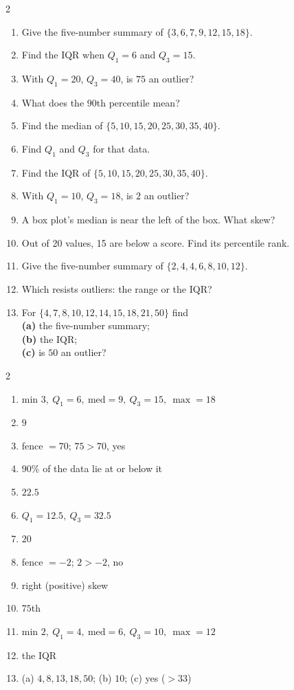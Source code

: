 \documentclass[11pt]{article}
\begin{document}
\clearpage
{}

\begin{recapbox}
\begin{multicols}{2}
\small
\begin{enumerate}[leftmargin=*,itemsep=3pt]
  \item Give the five-number summary of $\{3,6,7,9,12,15,18\}$.
  \item Find the IQR when $Q_1=6$ and $Q_3=15$.
  \item With $Q_1=20$, $Q_3=40$, is $75$ an outlier?
  \item What does the $90$th percentile mean?
  \item Find the median of $\{5,10,15,20,25,30,35,40\}$.
  \item Find $Q_1$ and $Q_3$ for that data.
  \item Find the IQR of $\{5,10,15,20,25,30,35,40\}$.
  \item With $Q_1=10$, $Q_3=18$, is $2$ an outlier?
  \item A box plot's median is near the left of the box. What skew?
  \item Out of 20 values, 15 are below a score. Find its percentile rank.
  \item Give the five-number summary of $\{2,4,4,6,8,10,12\}$.
  \item Which resists outliers: the range or the IQR?
  \item For $\{4,7,8,10,12,14,15,18,21,50\}$ find \\ \textbf{(a)} the five-number summary; \\ \textbf{(b)} the IQR; \\ \textbf{(c)} is $50$ an outlier?
\end{enumerate}
\end{multicols}
\end{recapbox}

\begin{keybox}
\begin{multicols}{2}
\small
\begin{enumerate}[leftmargin=*,itemsep=3pt]
  \item min $3,\ Q_1=6,\ \text{med}=9,\ Q_3=15,\ \max=18$
  \item $9$
  \item fence $=70$; $75>70$, yes
  \item $90\%$ of the data lie at or below it
  \item $22.5$
  \item $Q_1=12.5,\ Q_3=32.5$
  \item $20$
  \item fence $=-2$; $2>-2$, no
  \item right (positive) skew
  \item $75$th
  \item min $2,\ Q_1=4,\ \text{med}=6,\ Q_3=10,\ \max=12$
  \item the IQR
  \item (a) $4,8,13,18,50$; (b) $10$; (c) yes ($>33$)
\end{enumerate}
\end{multicols}
\end{keybox}
\end{document}
